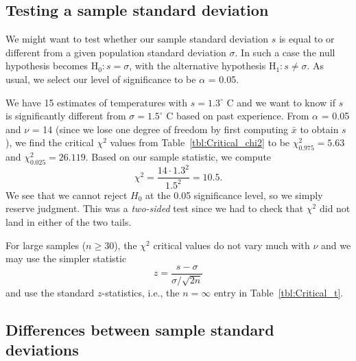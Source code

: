 \subsection{Testing a sample standard deviation}

	We might want to test whether our sample standard deviation $s$ is equal to or different from a 
given population standard deviation $\sigma$.  In such a case the null hypothesis becomes H$_0: s = \sigma$, with the alternative 
hypothesis H$_1: s \neq \sigma$.  As usual, we select our level of significance to be $\alpha$ = 0.05.
\begin{example}
	We have 15 estimates of temperatures with $s = 1.3^\circ$ C and we want to know if $s$ is 
significantly different from $\sigma = 1.5^\circ$ C based on past experience.  From $\alpha$ = 0.05 and $\nu$ = 14 (since we
lose one degree of freedom by first computing $\bar{x}$ to obtain $s$), we find the 
critical $\chi^2$ values from Table~\ref{tbl:Critical_chi2} to be $\chi^2_{0.975} = 5.63$ and $\chi^2_{0.025} = 26.119$.
Based on our sample statistic, we compute
\begin{equation}
\chi^2=\frac{14\cdot1.3^2}{1.5^2}=10.5.
\end{equation}
We see that we cannot reject $H_0$ at the 0.05 significance level, so we simply
reserve judgment.  This was a \emph{two-sided} test since we had to check that $\chi^2$  did not land in 
either of the two tails.
\end{example}

	For large samples ($n \geq 30$), the $\chi^2$ critical values do not vary much with $\nu$ and we may use the simpler statistic
\begin{equation}
z=\frac{s-\sigma}{\sigma/\sqrt{2n}}
\end{equation}
and use the standard $z$-statistics, i.e., the $n = \infty$ entry in Table~\ref{tbl:Critical_t}.

\subsection{Differences between sample standard deviations}
\label{sec:twostd}

